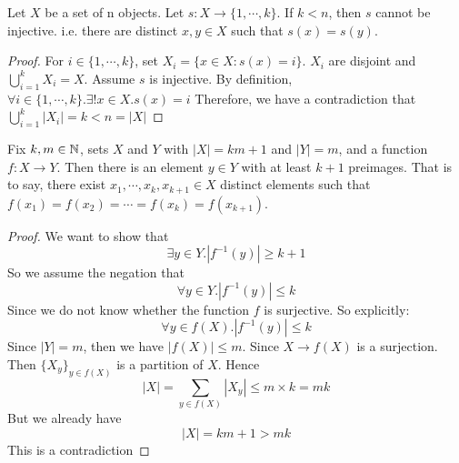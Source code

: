 \begin{theorem}
    Let $X$ be a set of n objects. Let $s:X \rightarrow \{1, \cdots ,k\}$. 
    If $k<n$, then $s$ cannot be injective. i.e. there are distinct $x,y \in X$ such that $s(x)=s(y)$.
\end{theorem}
\begin{proof}
    For $i \in \{1, \cdots ,k\}$, set $X_i=\{x \in X: s(x)=i\}$. 
    $X_i$ are disjoint and $\bigcup_{i=1}^kX_i=X$.
    Assume $s$ is injective. By definition, $\forall i \in \{1, \cdots ,k\}. \exists ! x \in X. s(x)=i$
    Therefore, we have a contradiction that $\bigcup_{i=1}^k|X_i|=k < n=|X|$
\end{proof}

\begin{theorem}
    Fix $k,m \in \mathbb{N}$, sets $X$ and $Y$ with $|X|=km+1$ and $|Y|=m$, 
    and a function $f:X \rightarrow Y$. Then there is an element $y \in Y$ with at least $k+1$ preimages. 
    That is to say, there exist $x_1, \cdots ,x_k,x_{k+1} \in X$ distinct elements such that $f(x_1)=f(x_2)= \cdots =f(x_k)=f(x_{k+1})$.
\end{theorem}
\begin{proof}
    We want to show that $$\exists y \in Y. |f^{-1}(y)| \geq k+1$$
    So we assume the negation that $$\forall y \in Y. |f^{-1}(y)| \leq k$$
    Since we do not know whether the function $f$ is surjective. So explicitly: $$\forall y \in f(X). |f^{-1}(y)| \leq k$$
    Since $|Y|=m$, then we have $|f(X)| \leq m$. Since $X \rightarrow f(X)$ is a surjection. Then $\{X_y\}_{y \in f(X)}$ is a partition of $X$. 
    Hence $$|X|=\sum_{y \in f(X)}|X_y| \leq m \times k=mk$$
    But we already have $$|X|=km+1 >mk$$
    This is a contradiction
\end{proof}

